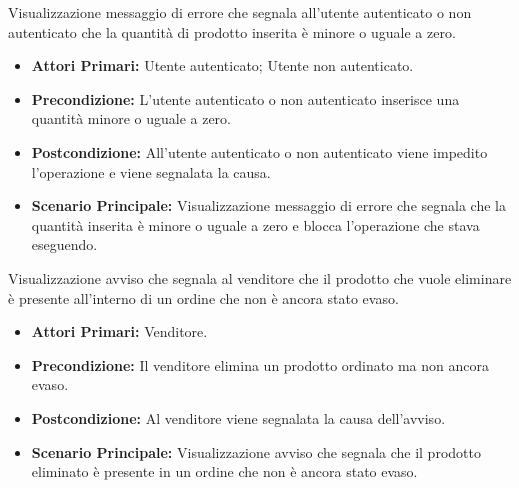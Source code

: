 Visualizzazione messaggio di errore che segnala all'utente autenticato o non autenticato che la quantità di prodotto inserita è minore o uguale a zero.
\begin{itemize}
    \item \textbf{Attori Primari:} Utente autenticato; Utente non autenticato.
    \item \textbf{Precondizione:} L'utente autenticato o non autenticato inserisce una quantità minore o uguale a zero.
    \item \textbf{Postcondizione:} All'utente autenticato o non autenticato viene impedito l'operazione e viene segnalata la causa.
    \item \textbf{Scenario Principale:} Visualizzazione messaggio di errore che segnala che la quantità inserita è minore o uguale a zero e blocca l'operazione che stava eseguendo.
\end{itemize}

Visualizzazione avviso che segnala al venditore che il prodotto che vuole eliminare è presente all'interno di un ordine che non è ancora stato evaso.
\begin{itemize}
    \item \textbf{Attori Primari:} Venditore.
    \item \textbf{Precondizione:} Il venditore elimina un prodotto ordinato ma non ancora evaso.
    \item \textbf{Postcondizione:} Al venditore viene segnalata la causa dell'avviso.
    \item \textbf{Scenario Principale:} Visualizzazione avviso che segnala che il prodotto eliminato è presente in un ordine che non è ancora stato evaso.
\end{itemize}
